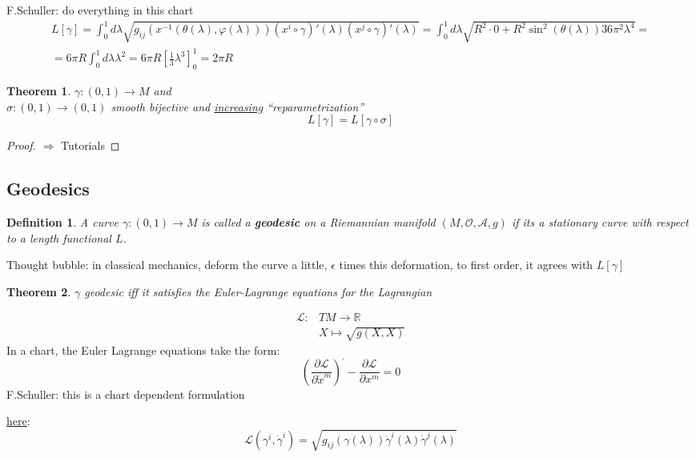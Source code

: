 \documentclass[10pt]{amsart}
\newtheorem{theorem}{Theorem}
\newtheorem{definition}{Definition}
\begin{document}
\begin{multicols*}{2}
	F.Schuller: do everything in this chart
	\[
	\begin{gathered}
	L[\gamma] = \int_0^1 d\lambda \sqrt{ g_{ij}(x^{-1}(\theta(\lambda) , \varphi(\lambda)))(x^i\circ \gamma)'(\lambda)(x^j\circ \gamma)'(\lambda) } = \int_0^1 d\lambda \sqrt{ R^2 \cdot 0 + R^2\sin^2{(\theta(\lambda))} 36 \pi^2 \lambda^4 } = \\
	= 6\pi R \int_0^1 d\lambda \lambda^2 = 6\pi R [ \frac{1}{3} \lambda^3 ]^1_0 = 2\pi R
	\end{gathered}
	\]
	
	\begin{theorem}
		$\gamma: (0,1) \to M$ and \\
		$\sigma:(0,1) \to (0,1)$ smooth bijective and \underline{increasing} ``reparametrization''
		\[
		L[\gamma] = L[\gamma \circ \sigma]
		\]
	\end{theorem}
	\begin{proof}
		$\Longrightarrow $ Tutorials
	\end{proof}
	
	\subsection{Geodesics}
	
	\begin{definition}
		A curve $\gamma:(0,1) \to M$ is called a \textbf{geodesic} on a Riemannian manifold $(M,\mathcal{O}, \mathcal{A}, g)$ if its a \emph{stationary} curve with respect to a length functional $L$.  
	\end{definition}
	
	Thought bubble: in classical mechanics, deform the curve a little, $\epsilon$ times this deformation, to first order, it agrees with $L[\gamma]$
	
	\begin{theorem}
		$\gamma$ geodesic iff it satisfies the Euler-Lagrange equations for the Lagrangian
	\end{theorem}
	
	\[
	\begin{aligned}
	\mathcal{L}:& TM \to \mathbb{R} \\
	& X \mapsto \sqrt{g(X,X)} \end{aligned}
	\]
	In a chart, the Euler Lagrange equations take the form:
	\[
	\left( \frac{ \partial \mathcal{L}}{  \partial \dot{x}^m } \right)^{\cdot} - \frac{ \partial \mathcal{L}}{ \partial x^m} = 0 
	\]
	F.Schuller: this is a chart dependent formulation
	
	\underline{here}: 
	\[
	\mathcal{L}(\gamma^i , \dot{\gamma}^i ) = \sqrt{ g_{ij}(\gamma(\lambda)) \dot{\gamma}^i(\lambda) \dot{\gamma}^j(\lambda)}
	\]
	

\end{multicols*}
\end{document}
